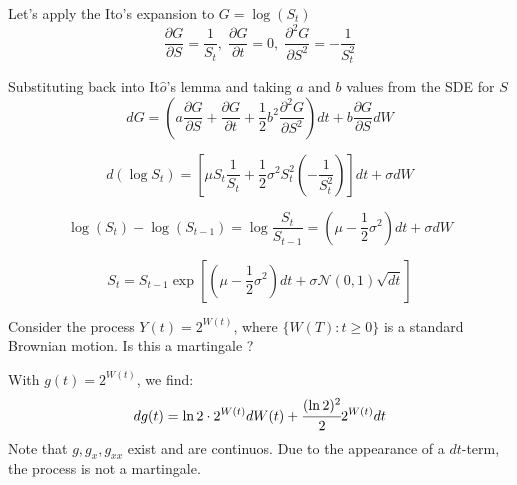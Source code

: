 \documentclass[12pt,a4paper]{book}
\begin{document}
\begin{solution}
Let's apply the Ito's expansion to $G=\log(S_t)$ 
\begin{equation*}
\frac{\partial G}{\partial S}=\frac{1}{S_t},\;\frac{\partial G}{\partial t}=0,\;\frac{\partial^2 G}{\partial S^2}=-\frac{1}{S_t^2}
\end{equation*}

Substituting back into It$\hat{o}$'s lemma and taking $a$ and $b$ values from the SDE for $S$
\begin{equation*}
dG = \left(a\frac{\partial G}{\partial S} + \frac{\partial G}{\partial t} + \frac{1}{2}b^2\frac{\partial^2 G}{\partial S^2}\right)dt + b\frac{\partial G}{\partial S} dW
\end{equation*}

\begin{equation*}
d(\log S_t) = \left[\mu S_t\frac{1}{S_t} + \frac{1}{2}\sigma^2S_t^2\left(-\frac{1}{S_t^2}\right)\right]dt + \sigma dW
\end{equation*}

\begin{equation*}
\log(S_t) - \log(S_{t-1}) = \log\frac{S_t}{S_{t-1}}=\left(\mu - \frac{1}{2}\sigma^2\right)dt + \sigma dW 
\end{equation*}	

\begin{equation*}
S_t = S_{t-1}\exp\left[\left(\mu-\frac{1}{2}\sigma^2\right)dt + \sigma\mathcal{N}(0,1)\sqrt{dt}\right] 
\end{equation*}
\end{solution}

\begin{exercise}[subtitle=Martingale, tags={sde}]
Consider the process $Y(t) = 2^{W(t)}$, where $\{W(T):t\geq 0\}$ is a standard Brownian motion. 
Is this a martingale ?
\end{exercise}
\begin{solution}
With $g(t)=2^{W(t)}$, we find:
\begin{equation*}
dg(t) = \ln2\cdot 2^{W(t)}dW(t) +\cfrac{(\ln2)^2}{2}2^{W(t)}dt
\end{equation*}
Note that $g, g_{x}, g_{xx}$ exist and are continuos. 
Due to the appearance of a $dt$-term, the process is not a martingale.	
\end{solution}
\end{document}
